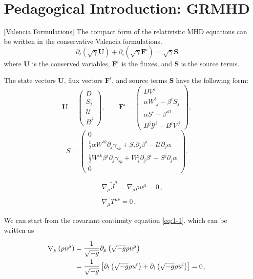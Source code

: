 \documentclass[%
 reprint,
 superscriptaddress,
 amsmath,amssymb,
 nofootinbib,
 prd,
]{revtex4-2}
\begin{document}
\section{Pedagogical Introduction: GRMHD}
[Valencia Formulations] The compact form of the relativistic MHD equations can be written in the conservative Valencia formulations.
\begin{equation}
    \partial_t(\sqrt{\gamma} \boldsymbol{U})+\partial_i\left(\sqrt{\gamma} \boldsymbol{F}^i\right)=\sqrt{\gamma} \boldsymbol{S}
\end{equation}
where $\boldsymbol{U}$ is the conserved variables, $\boldsymbol{F}^i$ is the fluxes, and $\boldsymbol{S}$ is the source terms.

The state vectors $\boldsymbol{U}$, flux vectors $\boldsymbol{F}^i$, and source terms $\boldsymbol{S}$ have the following form:
\begin{equation}
    \boldsymbol{U}=\left(\begin{array}{c}
    D \\
    S_j \\
    \mathscr{U} \\
    B^j
    \end{array}\right), \quad \quad \boldsymbol{F}^i=\left(\begin{array}{c}
    D \mathscr{V}^i \\
    \alpha W^i{ }_j-\beta^i S_j \\
    \alpha S^i-\beta^{i \mathscr{U}} \\
    B^j \mathscr{Y}^i-B^i \mathscr{V}^j
    \end{array}\right),
\end{equation}
\begin{equation}
    S=\left(\begin{array}{c}
    0 \\
    \frac{1}{2} \alpha W^{i k} \partial_j \gamma_{i k}+S_i \partial_j \beta^i-\mathscr{U} \partial_j \alpha \\
    \frac{1}{2} W^{i k} \beta^j \partial_j \gamma_{i k}+W_i^j \partial_j \beta^i-S^j \partial_j \alpha \\
    0
    \end{array}\right) .
\end{equation}

\begin{eqnarray}
  \label{eq:1-1}
  &&\nabla_\mu \tilde{J}^\mu = \nabla_\mu \rho u^\mu = 0\,,\\
  \nonumber \\
  \label{eq:1-2}
  &&\nabla_\mu T^{\mu \nu} = 0\,,
\end{eqnarray}

We can start from the covariant continuity equation \eqref{eq:1-1}, which
can be written as

\begin{align}
\nabla_\mu \left(\rho u^\mu\right) &= \frac{1}{\sqrt{-g}} \partial_\mu
\left(\sqrt{-g} \rho u^\mu\right) \notag \\ &= \frac{1}{\sqrt{-g}}
\left[\partial_t \left(\sqrt{-g} \rho u^t\right) + \partial_i
  \left(\sqrt{-g} \rho u^i\right)\right] = 0\,, \label{eq:continuity}
\end{align}




\end{document}
